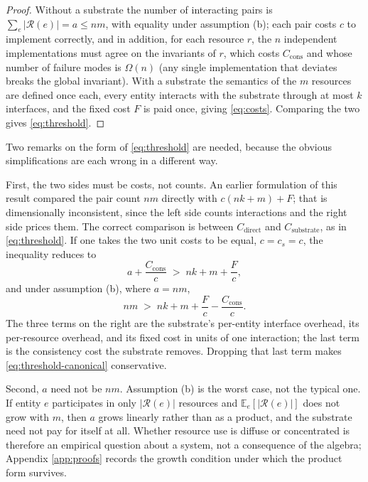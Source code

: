 \begin{proof}
Without a substrate the number of interacting pairs is $\sum_{e} |\mathcal{R}(e)| = a \le nm$,
with equality under assumption (b); each pair costs $c$ to implement correctly, and in addition, for
each resource $r$, the $n$ independent implementations must agree on the invariants of $r$, which
costs $C_{\mathrm{cons}}$ and whose number of failure modes is $\Omega(n)$ (any single
implementation that deviates breaks the global invariant). With a substrate the semantics of the
$m$ resources are defined once each, every entity interacts with the substrate through at most $k$
interfaces, and the fixed cost $F$ is paid once, giving \eqref{eq:costs}. Comparing the two gives
\eqref{eq:threshold}.
\end{proof}

Two remarks on the form of \eqref{eq:threshold} are needed, because the obvious simplifications are
each wrong in a different way.

First, the two sides must be costs, not counts. An earlier formulation of this result compared the
pair count $nm$ directly with $c(nk+m) + F$; that is dimensionally inconsistent, since the left side
counts interactions and the right side prices them. The correct comparison is between
$C_{\text{direct}}$ and $C_{\text{substrate}}$, as in \eqref{eq:threshold}. If one takes the two
unit costs to be equal, $c = c_s = c$, the inequality reduces to
\begin{equation}\label{eq:threshold-equal}
a + \frac{C_{\mathrm{cons}}}{c} \;>\; n k + m + \frac{F}{c},
\end{equation}
and under assumption (b), where $a = nm$,
\begin{equation}\label{eq:threshold-canonical}
n m \;>\; n k + m + \frac{F}{c} - \frac{C_{\mathrm{cons}}}{c}.
\end{equation}
The three terms on the right are the substrate's per-entity interface overhead, its per-resource
overhead, and its fixed cost in units of one interaction; the last term is the consistency cost the
substrate removes. Dropping that last term makes \eqref{eq:threshold-canonical} conservative.

Second, $a$ need not be $nm$. Assumption (b) is the worst case, not the typical one. If entity $e$
participates in only $|\mathcal{R}(e)|$ resources and $\mathbb{E}_e[|\mathcal{R}(e)|]$ does not grow
with $m$, then $a$ grows linearly rather than as a product, and the substrate need not pay for
itself at all. Whether resource use is diffuse or concentrated is therefore an empirical question
about a system, not a consequence of the algebra; Appendix \ref{app:proofs} records the growth
condition under which the product form survives.

